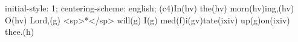 initial-style: 1;
centering-scheme: english;
(c4)In(hv) the(hv) morn(hv)ing,(hv) O(hv) Lord,(g) <sp>*</sp> will(g) I(g) med(f)i(gv)tate(ixiv) up(g)on(ixiv) thee.(h)
